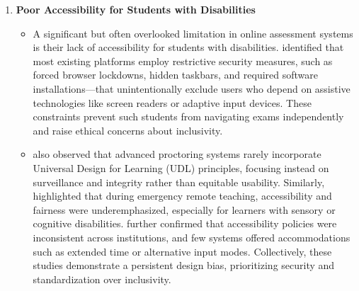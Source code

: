 \begin{enumerate}
    \item \textbf{Poor Accessibility for Students with Disabilities} 
        \begin{itemize}
            \item A significant but often overlooked limitation in online assessment systems is their lack of accessibility for students with disabilities. \citet{Topuz2022} identified that most existing platforms employ restrictive security measures, such as forced browser lockdowns, hidden taskbars, and required software installations—that unintentionally exclude users who depend on assistive technologies like screen readers or adaptive input devices. These constraints prevent such students from navigating exams independently and raise ethical concerns about inclusivity.
            \item \citet{Hussein2020} also observed that advanced proctoring systems rarely incorporate Universal Design for Learning (UDL) principles, focusing instead on surveillance and integrity rather than equitable usability. Similarly, \citet{Rahim2020} highlighted that during emergency remote teaching, accessibility and fairness were underemphasized, especially for learners with sensory or cognitive disabilities. \citet{UcaGunes2024} further confirmed that accessibility policies were inconsistent across institutions, and few systems offered accommodations such as extended time or alternative input modes. Collectively, these studies demonstrate a persistent design bias, prioritizing security and standardization over inclusivity.
        \end{itemize}
    



\end{enumerate}
